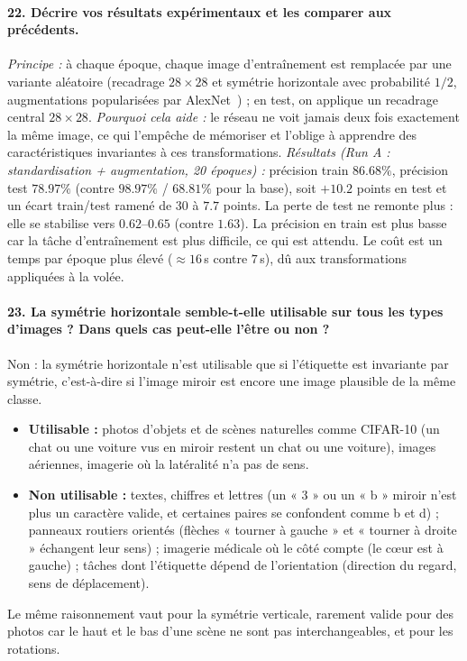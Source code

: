 \documentclass{report}
\begin{document}
\paragraph{22. Décrire vos résultats expérimentaux et les comparer aux précédents.}
 \textit{Principe :} à chaque époque, chaque image d'entraînement est remplacée par une variante aléatoire (recadrage $28 \times 28$ et symétrie horizontale avec probabilité $1/2$, augmentations popularisées par AlexNet~\cite{krizhevsky2012}) ; en test, on applique un recadrage central $28 \times 28$. \textit{Pourquoi cela aide :} le réseau ne voit jamais deux fois exactement la même image, ce qui l'empêche de mémoriser et l'oblige à apprendre des caractéristiques invariantes à ces transformations. \textit{Résultats (Run A : standardisation + augmentation, 20 époques) :} précision train $86.68\%$, précision test \textbf{$78.97\%$} (contre $98.97\%$ / $68.81\%$ pour la base), soit $+10.2$ points en test et un écart train/test ramené de $30$ à $7.7$ points. La perte de test ne remonte plus : elle se stabilise vers $0.62$--$0.65$ (contre $1.63$). La précision en train est plus basse car la tâche d'entraînement est plus difficile, ce qui est attendu. Le coût est un temps par époque plus élevé ($\approx 16$\,s contre $7$\,s), dû aux transformations appliquées à la volée.

\paragraph{23. La symétrie horizontale semble-t-elle utilisable sur tous les types d'images ? Dans quels cas peut-elle l'être ou non ?}
 Non : la symétrie horizontale n'est utilisable que si l'étiquette est invariante par symétrie, c'est-à-dire si l'image miroir est encore une image plausible de la même classe.
\begin{itemize}
    \item \textbf{Utilisable :} photos d'objets et de scènes naturelles comme CIFAR-10 (un chat ou une voiture vus en miroir restent un chat ou une voiture), images aériennes, imagerie où la latéralité n'a pas de sens.
    \item \textbf{Non utilisable :} textes, chiffres et lettres (un « 3 » ou un « b » miroir n'est plus un caractère valide, et certaines paires se confondent comme b et d) ; panneaux routiers orientés (flèches « tourner à gauche » et « tourner à droite » échangent leur sens) ; imagerie médicale où le côté compte (le cœur est à gauche) ; tâches dont l'étiquette dépend de l'orientation (direction du regard, sens de déplacement).
\end{itemize}
Le même raisonnement vaut pour la symétrie verticale, rarement valide pour des photos car le haut et le bas d'une scène ne sont pas interchangeables, et pour les rotations.
\end{document}

